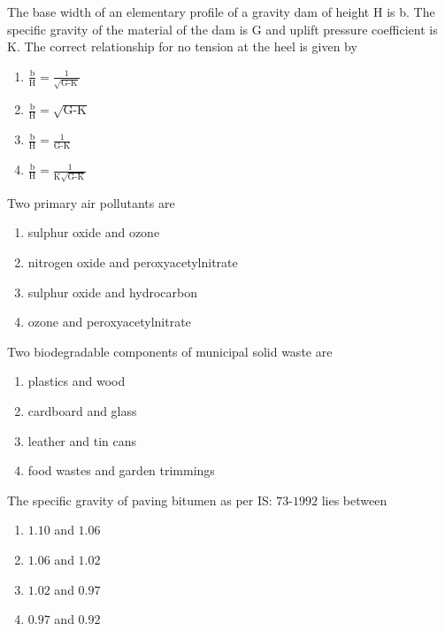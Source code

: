 \item The base width of an elementary profile of a gravity dam of height H is b. The specific gravity of the material of the dam is G and uplift pressure coefficient is K. The correct relationship for no tension at the heel is given by

\begin{enumerate}
	\item $\frac{\text{b}}{\text{H}} = \frac{1}{\sqrt{\text{G-K}}}$
	\item $\frac{\text{b}}{\text{H}} = \sqrt{\text{G-K}}$
	\item $\frac{\text{b}}{\text{H}} = \frac{1}{\text{G-K}}$
	\item $\frac{\text{b}}{\text{H}} = \frac{1}{\text{K}\sqrt{\text{G-K}}}$
\end{enumerate}

\item Two primary air pollutants are

\begin{enumerate}
	\item sulphur oxide and ozone
	\item nitrogen oxide and peroxyacetylnitrate
	\item sulphur oxide and hydrocarbon
	\item ozone and peroxyacetylnitrate
\end{enumerate}

\item Two biodegradable components of municipal solid waste are

\begin{enumerate}
	\item plastics and wood
	\item cardboard and glass
	\item leather and tin cans
	\item food wastes and garden trimmings
\end{enumerate}

\item The specific gravity of paving bitumen as per IS: $73$-$1992$ lies between

\begin{enumerate}
	\item $1.10$ and $1.06$
	\item $1.06$ and $1.02$
	\item $1.02$ and $0.97$
	\item $0.97$ and $0.92$
\end{enumerate}


